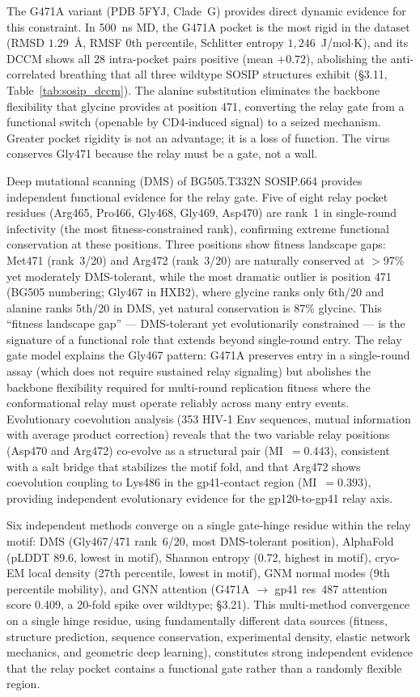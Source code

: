 \documentclass[11pt,a4paper]{article}
\begin{document}
The G471A variant (PDB 5FYJ, Clade~G) provides direct dynamic evidence for this constraint. In 500~ns MD, the G471A pocket is the most rigid in the dataset (RMSD $1.29$~\AA, RMSF 0th percentile, Schlitter entropy $1{,}246$~J/mol$\cdot$K), and its DCCM shows all 28 intra-pocket pairs positive (mean $+0.72$), abolishing the anti-correlated breathing that all three wildtype SOSIP structures exhibit (\S3.11, Table~\ref{tab:sosip_dccm}). The alanine substitution eliminates the backbone flexibility that glycine provides at position 471, converting the relay gate from a functional switch (openable by CD4-induced signal) to a seized mechanism. Greater pocket rigidity is not an advantage; it is a loss of function. The virus conserves Gly471 because the relay must be a gate, not a wall.

Deep mutational scanning (DMS) of BG505.T332N SOSIP.664 \citep{Haddox2018} provides independent functional evidence for the relay gate. Five of eight relay pocket residues (Arg465, Pro466, Gly468, Gly469, Asp470) are rank~1 in single-round infectivity (the most fitness-constrained rank), confirming extreme functional conservation at these positions. Three positions show fitness landscape gaps: Met471 (rank~3/20) and Arg472 (rank~3/20) are naturally conserved at $>$97\% yet moderately DMS-tolerant, while the most dramatic outlier is position 471 (BG505 numbering; Gly467 in HXB2), where glycine ranks only 6th/20 and alanine ranks 5th/20 in DMS, yet natural conservation is 87\% glycine. This ``fitness landscape gap'' --- DMS-tolerant yet evolutionarily constrained --- is the signature of a functional role that extends beyond single-round entry. The relay gate model explains the Gly467 pattern: G471A preserves entry in a single-round assay (which does not require sustained relay signaling) but abolishes the backbone flexibility required for multi-round replication fitness where the conformational relay must operate reliably across many entry events. Evolutionary coevolution analysis (353 HIV-1 Env sequences, mutual information with average product correction) reveals that the two variable relay positions (Asp470 and Arg472) co-evolve as a structural pair (MI~$= 0.443$), consistent with a salt bridge that stabilizes the motif fold, and that Arg472 shows coevolution coupling to Lys486 in the gp41-contact region (MI~$= 0.393$), providing independent evolutionary evidence for the gp120-to-gp41 relay axis.

Six independent methods converge on a single gate-hinge residue within the relay motif: DMS (Gly467/471 rank~6/20, most DMS-tolerant position), AlphaFold (pLDDT 89.6, lowest in motif), Shannon entropy (0.72, highest in motif), cryo-EM local density (27th percentile, lowest in motif), GNM normal modes (9th percentile mobility), and GNN attention (G471A $\to$ gp41 res~487 attention score 0.409, a 20-fold spike over wildtype; \S3.21). This multi-method convergence on a single hinge residue, using fundamentally different data sources (fitness, structure prediction, sequence conservation, experimental density, elastic network mechanics, and geometric deep learning), constitutes strong independent evidence that the relay pocket contains a functional gate rather than a randomly flexible region.
\end{document}
